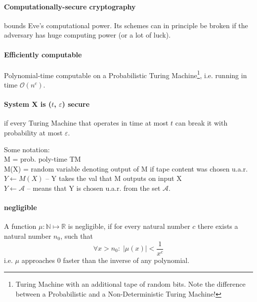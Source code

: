 \paragraph{Computationally-secure cryptography} bounds Eve's computational  power.
Its schemes can in principle be broken if the adversary has huge computing power (or a lot of luck).

\paragraph{Efficiently computable} Polynomial-time computable on a Probabilistic Turing Machine\footnote{Turing Machine with an additional tape of random bits. Note the difference between a Probabilistic and a Non-Deterministic Turing Machine!}, i.e. running in time $\mathcal{O}(n^c)$.

\paragraph{System X is ($t$, $\varepsilon$) secure} if every Turing Machine that operates in time at most $t$ can break it with probability at most $\varepsilon$.

Some notation: \\
M = prob. poly-time TM \\
M(X) = random variable denoting output of M if tape content was chosen u.a.r.\\
$Y\leftarrow M(X)$ -- Y takes the val that M outputs on input X\\
$Y\leftarrow \mathcal{A}$ -- means that Y is chosen u.a.r. from the set $\mathcal{A}$.

\paragraph{negligible} A function $\mu : \mathbb{N} \mapsto \mathbb{R}$ is negligible, if for every natural number $c$ there exists a natural number $n_0$, such that
$$\forall x > n_0: \;| \mu(x) | < \frac{1}{x^c}$$
i.e. $\mu$ approaches 0 faster than the inverse of any polynomial.

